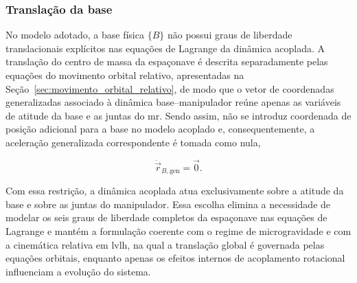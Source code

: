 \subsubsection{Translação da base}
No modelo adotado, a base física $\{B\}$ não possui graus de liberdade translacionais explícitos nas equações de Lagrange da dinâmica acoplada.
A translação do centro de massa da espaçonave é descrita separadamente pelas equações do movimento orbital relativo, apresentadas na Seção~\ref{sec:movimento_orbital_relativo}, de modo que o vetor de coordenadas generalizadas associado à dinâmica base--manipulador reúne apenas as variáveis de atitude da base e as juntas do \gls{mr}.
Sendo assim, não se introduz coordenada de posição adicional para a base no modelo acoplado e, consequentemente, a aceleração generalizada correspondente é tomada como nula,

\begin{equation}
\ddot{\vec r}_{B,\text{gen}} = \vec 0.
\end{equation}

Com essa restrição, a dinâmica acoplada atua exclusivamente sobre a atitude da base e sobre as juntas do manipulador. Essa escolha elimina a necessidade de modelar os seis graus de liberdade completos da espaçonave nas equações de Lagrange e mantém a formulação coerente com o regime de microgravidade e com a cinemática relativa em \gls{lvlh}, na qual a translação global é governada pelas equações orbitais, enquanto apenas os efeitos internos de acoplamento rotacional influenciam a evolução do sistema.